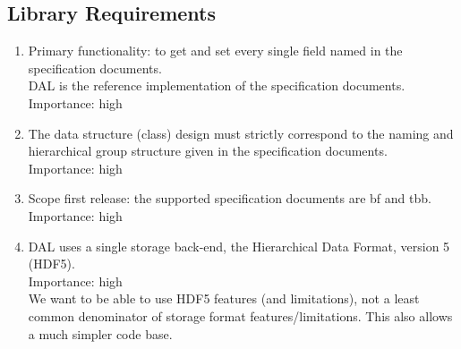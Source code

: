 \documentclass[a4paper,11pt]{article}
\begin{document}
\subsection{Library Requirements} \label{sec:lib_reqs}
\begin{enumerate}[label=\it R.\arabic{*}]
\itemsep0em

\item \label{req:getset-fields} Primary functionality: to get and set every single field named in the specification documents.\\
DAL is the reference implementation of the specification documents.\\
Importance: high\\

\item \label{req:data_struc_design} The data structure (class) design must strictly correspond to the naming and hierarchical group structure given in the specification documents.\\
Importance: high\\

\item \label{req:scope_1st_release} Scope first release: the supported specification documents are bf and tbb.\\
Importance: high\\

\item \label{req:storage_backend} DAL uses a single storage back-end, the Hierarchical Data Format, version 5 (HDF5).\\
Importance: high\\
We want to be able to use HDF5 features (and limitations), not a least common denominator of storage format features/limitations.
This also allows a much simpler code base.


\end{enumerate}
\end{document}
